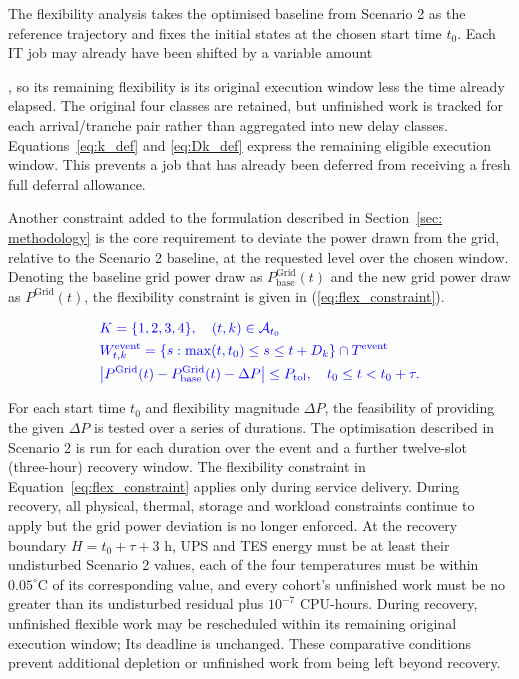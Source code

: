 \documentclass[lettersize,journal]{IEEEtran}
\providecommand{\DIFadd}[1]{{\color{blue}#1}}
\providecommand{\DIFaddbegin}{}
\providecommand{\DIFaddend}{}
\begin{document}
The flexibility analysis takes the optimised baseline from Scenario  \DIFaddbegin \DIFadd{2 }\DIFaddend as the reference trajectory and fixes the initial states at the chosen start time $t_0$.  \DIFaddbegin \DIFadd{Each IT job may already have }\DIFaddend been shifted by a variable amount \DIFaddbegin \DIFadd{, so its remaining flexibility is its original execution window less the time already elapsed. The original four classes are retained, but unfinished work is tracked for each arrival/tranche pair rather than aggregated into new delay classes. Equations~\eqref{eq:k_def} and \eqref{eq:Dk_def} express the remaining eligible execution window. This prevents a job that has already been deferred from receiving a fresh full deferral allowance.

}\DIFaddend 

 \DIFaddbegin \DIFadd{Another constraint added }\DIFaddend to the formulation described in Section~\ref{sec: methodology}  is the core requirement to deviate the power drawn from the grid, relative to the Scenario 2 baseline, at the requested level over the chosen window. Denoting the baseline grid power draw as $P^{\mathrm{Grid}}_{\mathrm{base}}(t)$ and the new grid power draw as $P^{\mathrm{Grid}}(t)$, the flexibility constraint is given in (\ref{eq:flex_constraint}).

 \DIFaddbegin \begin{align}
& \DIFadd{K=\{1,2,3,4\},\quad (t,k)\in\mathcal A_{t_0} \label{eq:k_def} }\\
& \DIFadd{W^{\mathrm{event}}_{t,k}=\{s:\max(t,t_0)\leq s\leq t+D_k\}\cap T^{\mathrm{event}} \label{eq:Dk_def} }\\
& \DIFadd{\left|P^{\mathrm{Grid}}(t)-P^{\mathrm{Grid}}_{\mathrm{base}}(t)-\Delta P\right|\leq P_{\mathrm{tol}},\quad t_0\leq t<t_0+\tau. \label{eq:flex_constraint}
}\end{align}\DIFaddend 

For each start time $t_0$ and flexibility magnitude $\Delta P$, the feasibility of providing the given $\Delta P$ is tested over a series of durations. The optimisation described in Scenario 2 is run for each duration  \DIFaddbegin \DIFadd{over the event and a further twelve-slot (three-hour) recovery window}\DIFaddend . The flexibility  \DIFaddbegin \DIFadd{constraint in Equation~\eqref{eq:flex_constraint} applies only during service delivery. During recovery, all physical, thermal, storage and workload constraints continue to apply but the grid power deviation is no longer enforced. At the recovery boundary $H=t_0+\tau+3$ h, UPS and TES energy must be at least their undisturbed }\DIFaddend Scenario 2  \DIFaddbegin \DIFadd{values, each of the four temperatures must be within $0.05^\circ$C of its corresponding value, and every cohort's unfinished work must be no greater than its undisturbed residual plus $10^{-7}$ CPU-hours. During recovery, unfinished flexible work may be rescheduled within its remaining original execution window; Its deadline is unchanged. These comparative conditions prevent additional depletion or unfinished work from being left beyond recovery}\DIFaddend .
\end{document}

